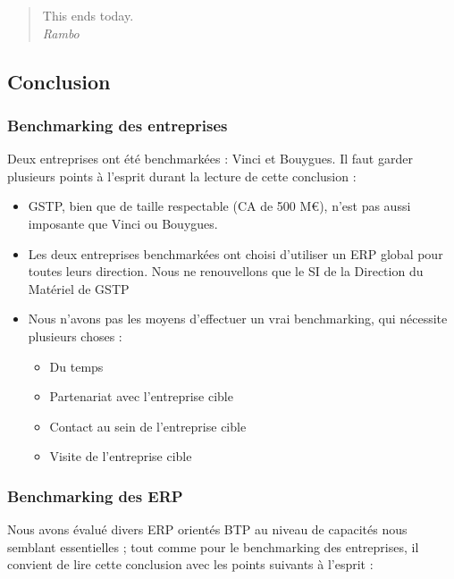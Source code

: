 \documentclass[a4paper]{article}
\begin{document}
\maketitle

\begin{quote}
This ends today.\\
\em Rambo
\end{quote}

\subsection{Conclusion}

\subsubsection{Benchmarking des entreprises}

Deux entreprises ont été benchmarkées : Vinci et Bouygues. Il faut garder
plusieurs points à l'esprit durant la lecture de cette conclusion :

\begin{itemize}
\item GSTP, bien que de taille respectable (CA de 500 M\euro), n'est pas aussi
imposante que Vinci ou Bouygues.
\item Les deux entreprises benchmarkées ont choisi d'utiliser un ERP
global pour toutes leurs direction. Nous ne renouvellons que le SI de la
Direction du Matériel de GSTP
\item Nous n'avons pas les moyens d'effectuer un vrai benchmarking, qui
nécessite plusieurs choses :
    \begin{itemize}
    \item Du temps
    \item Partenariat avec l'entreprise cible
    \item Contact au sein de l'entreprise cible
    \item Visite de l'entreprise cible
    \end{itemize}
\end{itemize}


\subsubsection{Benchmarking des ERP}

Nous avons évalué divers ERP orientés BTP au niveau de capacités nous
semblant essentielles ; tout comme pour le benchmarking des entreprises, il
convient de lire cette conclusion avec les points suivants à l'esprit :
\end{document}
